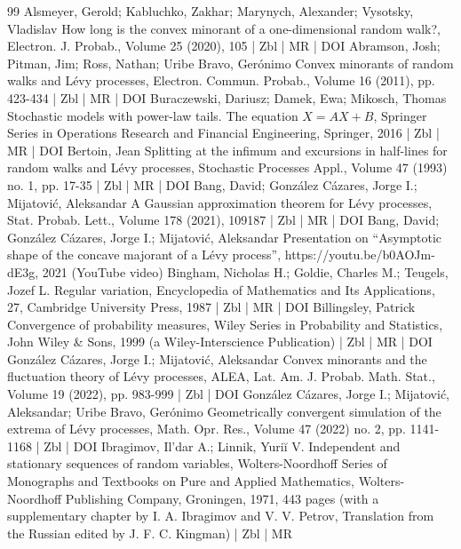 \documentclass[10pt]{amsart}
\theoremstyle{definition}\newtheorem{defi}[theo]{Definition}\newtheorem{rema}[theo]{Remark}\newtheorem{exam}[theo]{Example}\newtheorem{exem}[theo]{Example}\newtheorem{nota}[theo]{Notation}
\newcommand\1{\mathds{1}}
\begin{document}
\begin{thebibliography}{99}
Alsmeyer, Gerold; Kabluchko, Zakhar; Marynych, Alexander; Vysotsky, Vladislav How long is the convex minorant of a one-dimensional random walk?, Electron. J. Probab., Volume 25 (2020), 105 | Zbl | MR | DOI
Abramson, Josh; Pitman, Jim; Ross, Nathan; Uribe Bravo, Gerónimo Convex minorants of random walks and Lévy processes, Electron. Commun. Probab., Volume 16 (2011), pp. 423-434 | Zbl | MR | DOI
Buraczewski, Dariusz; Damek, Ewa; Mikosch, Thomas Stochastic models with power-law tails. The equation $X=AX+B$, Springer Series in Operations Research and Financial Engineering, Springer, 2016 | Zbl | MR | DOI
Bertoin, Jean Splitting at the infimum and excursions in half-lines for random walks and Lévy processes, Stochastic Processes Appl., Volume 47 (1993) no. 1, pp. 17-35 | Zbl | MR | DOI
Bang, David; González Cázares, Jorge I.; Mijatović, Aleksandar A Gaussian approximation theorem for Lévy processes, Stat. Probab. Lett., Volume 178 (2021), 109187 | Zbl | MR | DOI
Bang, David; González Cázares, Jorge I.; Mijatović, Aleksandar Presentation on “Asymptotic shape of the concave majorant of a Lévy process”, https://youtu.be/b0AOJm-dE3g, 2021 (YouTube video)
Bingham, Nicholas H.; Goldie, Charles M.; Teugels, Jozef L. Regular variation, Encyclopedia of Mathematics and Its Applications, 27, Cambridge University Press, 1987 | Zbl | MR | DOI
Billingsley, Patrick Convergence of probability measures, Wiley Series in Probability and Statistics, John Wiley \& Sons, 1999 (a Wiley-Interscience Publication) | Zbl | MR | DOI
González Cázares, Jorge I.; Mijatović, Aleksandar Convex minorants and the fluctuation theory of Lévy processes, ALEA, Lat. Am. J. Probab. Math. Stat., Volume 19 (2022), pp. 983-999 | Zbl | DOI
González Cázares, Jorge I.; Mijatović, Aleksandar; Uribe Bravo, Gerónimo Geometrically convergent simulation of the extrema of Lévy processes, Math. Opr. Res., Volume 47 (2022) no. 2, pp. 1141-1168 | Zbl | DOI
Ibragimov, Il’dar A.; Linnik, Yuriĭ V. Independent and stationary sequences of random variables, Wolters-Noordhoff Series of Monographs and Textbooks on Pure and Applied Mathematics, Wolters-Noordhoff Publishing Company, Groningen, 1971, 443 pages (with a supplementary chapter by I. A. Ibragimov and V. V. Petrov, Translation from the Russian edited by J. F. C. Kingman) | Zbl | MR

\end{thebibliography}
\end{document}
